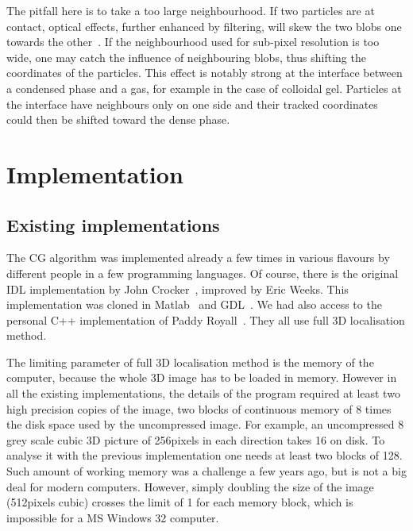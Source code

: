 The pitfall here is to take a too large neighbourhood. If two particles are at contact, optical effects, further enhanced by filtering, will skew the two blobs one towards the other~\citep{Baumgartland2005}. If the neighbourhood used for sub-pixel resolution is too wide, one may catch the influence of neighbouring blobs, thus shifting the coordinates of the particles. This effect is notably strong at the interface between a condensed phase and a gas, for example in the case of colloidal gel. Particles at the interface have neighbours only on one side and their tracked coordinates could then be shifted toward the dense phase.

\section{Implementation}

\subsection{Existing implementations}

The \ac{CG} algorithm was implemented already a few times in various flavours by different people in a few programming languages. Of course, there is the original IDL implementation by John Crocker~\citep{crocker1996mdv}, improved by Eric Weeks. This implementation was cloned in Matlab~\citep{BlairDufesneMatlab, Gao2009} and GDL~\citep{Desmond}. We had also access to the personal C++ implementation of Paddy Royall~\citep{Royall2003}. They all use full 3D localisation method. 

The limiting parameter of full 3D localisation method is the memory of the computer, because the whole 3D image has to be loaded in memory. However in all the existing implementations, the details of the program required at least two high precision copies of the image,  two blocks of continuous memory of 8 times the disk space used by the uncompressed image. For example, an uncompressed \unit{8}{\bit} grey scale cubic 3D picture of \unit{256}{pixels} in each direction takes \unit{16}{\mega\byte} on disk. To analyse it with the previous implementation one needs at least two blocks of \unit{128}{\mega\byte}. Such amount of working memory was a challenge a few years ago, but is not a big deal for modern computers. However, simply doubling the size of the image (\unit{512}{pixels} cubic) crosses the limit of \unit{1}{\giga\byte} for each memory block, which is impossible for a MS Windows \unit{32}{\bit} computer.

